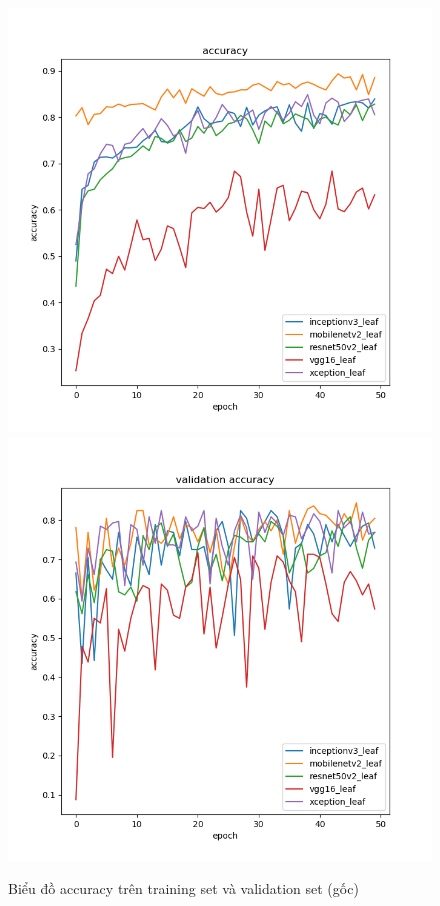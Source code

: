 \documentclass[a4paper,14pt]{extarticle}
\begin{document}
		\begin{figure}[H]
			\centering
			\includegraphics[scale=0.4]{images/leaf_accuracy.png}
			\includegraphics[scale=0.4]{images/leaf_val_accuracy.png}
			\caption{Biểu đồ accuracy trên training set và validation set (gốc)}
		\end{figure}
\end{document}
